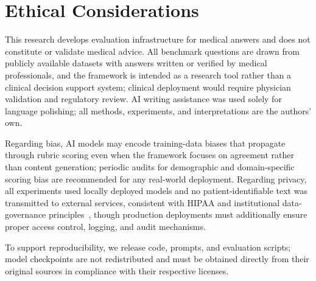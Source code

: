 \documentclass[11pt]{article}
\begin{document}
\section*{Ethical Considerations}

This research develops evaluation infrastructure for medical answers and does not constitute or validate medical advice. All benchmark questions are drawn from publicly available datasets with answers written or verified by medical professionals, and the framework is intended as a research tool rather than a clinical decision support system; clinical deployment would require physician validation and regulatory review. AI writing assistance was used solely for language polishing; all methods, experiments, and interpretations are the authors' own.

Regarding bias, AI models may encode training-data biases that propagate through rubric scoring even when the framework focuses on agreement rather than content generation; periodic audits for demographic and domain-specific scoring bias are recommended for any real-world deployment. Regarding privacy, all experiments used locally deployed models and no patient-identifiable text was transmitted to external services, consistent with HIPAA and institutional data-governance principles~\citep{cohen2017hipaa}, though production deployments must additionally ensure proper access control, logging, and audit mechanisms. 

To support reproducibility, we release code, prompts, and evaluation scripts; model checkpoints are not redistributed and must be obtained directly from their original sources in compliance with their respective licenses.



%


\appendix
\end{document}

